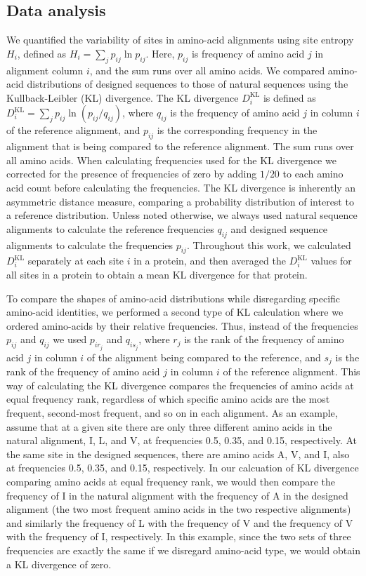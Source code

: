 \documentclass[12pt]{article}
\begin{document}
\subsection{Data analysis}

We quantified the variability of sites in amino-acid alignments using site entropy $H_i$, defined as $H_i=\sum_{j}p_{ij}\ln p_{ij}$. Here, $p_{ij}$ is frequency of amino acid $j$ in alignment column $i$, and the sum runs over all amino acids. We compared amino-acid distributions of designed sequences to those of natural sequences using the Kullback-Leibler (KL) divergence. The KL divergence $D^\text{KL}_i$ is defined as $D^\text{KL}_i= \sum_j  p_{ij} \ln  (p_{ij}/q_{ij})$, where $q_{ij}$ is the frequency of amino acid $j$ in column $i$ of the reference alignment, and $p_{ij}$ is the corresponding frequency in the alignment that is being compared to the reference alignment. The sum runs over all amino acids.  When calculating frequencies used for the KL divergence we corrected for the presence of frequencies of zero by adding  $1/20$ to each amino acid count before calculating the frequencies. The KL divergence is inherently an asymmetric distance measure, comparing a probability distribution of interest to a reference distribution. Unless noted otherwise, we always used natural sequence alignments to calculate the reference frequencies $q_{ij}$ and designed sequence alignments to calculate the frequencies $p_{ij}$. Throughout this work, we calculated $D^\text{KL}_i$ separately at each site $i$ in a protein, and then averaged the $D^\text{KL}_i$ values for all sites in a protein to obtain a mean KL divergence for that protein.

To compare the shapes of amino-acid distributions while disregarding specific amino-acid identities, we performed a second type of KL calculation where we ordered amino-acids by their relative frequencies. Thus, instead of the frequencies $p_{ij}$ and $q_{ij}$ we used $p_{ir_j}$ and $q_{is_j}$, where $r_j$ is the rank of the frequency of amino acid $j$ in column $i$ of the alignment being compared to the reference, and $s_j$ is the rank of the frequency of amino acid $j$ in column $i$ of the reference alignment. This way of calculating the KL divergence compares the frequencies of amino acids at equal frequency rank, regardless of which specific amino acids are the most frequent, second-most frequent, and so on in each alignment. As an example, assume that at a given site there are only three different amino acids in the natural alignment, I, L, and V, at frequencies 0.5, 0.35, and 0.15, respectively. At the same site in the designed sequences, there are amino acids A, V, and I, also at frequencies 0.5, 0.35, and 0.15, respectively. In our calcuation of KL divergence comparing amino acids at equal frequency rank, we would then compare the frequency of I in the natural alignment with the frequency of A in the designed alignment (the two most frequent amino acids in the two respective alignments) and similarly the frequency of L with the frequency of V and the frequency of V with the frequency of I, respectively. In this example, since the two sets of three frequencies are exactly the same if we disregard amino-acid type, we would obtain a KL divergence of zero.
\end{document}
